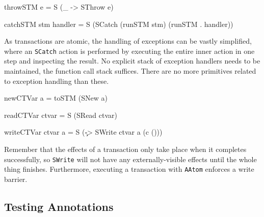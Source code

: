 
\begin{haskellcode}
throwSTM e = S (\_ -> SThrow e)

catchSTM stm handler = S (SCatch (runSTM stm) (runSTM . handler))
\end{haskellcode}



As transactions are atomic, the handling of exceptions can be vastly
simplified, where an \verb|SCatch| action is performed by executing
the entire inner action in one step and inspecting the result. No
explicit stack of exception handlers needs to be maintained, the
function call stack suffices. There are no more primitives related to
exception handling than these.

\begin{haskellcode}
newCTVar a = toSTM (SNew a)
\end{haskellcode}


\begin{haskellcode}
readCTVar ctvar = S (SRead ctvar)
\end{haskellcode}


\begin{haskellcode}
writeCTVar ctvar a = S (\c -> SWrite ctvar a (c ()))
\end{haskellcode}


Remember that the effects of a transaction only take place when it
completes successfully, so \verb|SWrite| will not have any
externally-visible effects until the whole thing
finishes. Furthermore, executing a transaction with \verb|AAtom|
enforces a write barrier.

\subsection{Testing Annotations}
\label{sec:execution-primops-annotations}


